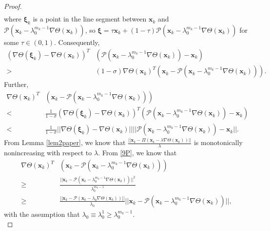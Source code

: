 \begin{proof}
\begin{align*}
	\end{align*}
	where $ \bm{\xi}_k $ is a point in the line segment between $ \textbf{x}_k $ and $ \mathcal{P}  (\textbf{x}_k - \lambda_0^{m_{k}-1} \nabla \Theta(\textbf{x}_k)) $, so $ \bm{\xi} = \tau \textbf{x}_k + (1-\tau) \mathcal{P}(\textbf{x}_k - \lambda_0^{m_{k}-1} \nabla \Theta (\textbf{x}_k))$ for some $\tau \in (0,1)  $.
	Consequently, 
	\begin{align*}
	(\nabla \Theta(\bm{\xi}_k) - \nabla \Theta(\textbf{x}_k))^T & (\mathcal{P}(\textbf{x}_k - \lambda_0^{m_{k}-1} \nabla \Theta(\textbf{x}_k))- \textbf{x}_k)\\
	> &(1 -\sigma) \nabla \Theta(\textbf{x}_k)^T ( \textbf{x}_k - \mathcal{P}(\textbf{x}_k - \lambda_0^{m_{k}-1} \nabla \Theta(\textbf{x}_k))).
	\end{align*}
	Further, 
	\begin{equation} \label{18P}
	\begin{split}
	\nabla \Theta(\textbf{x}_k)^T & ( \textbf{x}_k - \mathcal{P}(\textbf{x}_k - \lambda_0^{m_{k}-1} \nabla \Theta(\textbf{x}_k)))\\
	< &\frac{1}{1 -\sigma} (\nabla \Theta(\bm{\xi}_k) - \nabla \Theta(\textbf{x}_k))^T(\mathcal{P}(\textbf{x}_k - \lambda_0^{m_{k}-1} \nabla \Theta(\textbf{x}_k))- \textbf{x}_k)\\
	< &\frac{1}{1 -\sigma} ||\nabla \Theta(\bm{\xi}_k) - \nabla \Theta(\textbf{x}_k)|| ||\mathcal{P}(\textbf{x}_k - \lambda_0^{m_{k}-1} \nabla \Theta(\textbf{x}_k))- \textbf{x}_k||.
	\end{split}
	\end{equation}
	From Lemma \ref{lem2paper}, we know that $ \frac{|| \textbf{x}_k - \varPi(\textbf{x}_k -  \lambda \nabla \Theta (\textbf{x}_k)) ||}{\lambda} $ is monotonically nonincreasing with respect to $ \lambda $. 
	From \eqref{9P}, we know that 
	\begin{align*}
	\nabla \Theta(\textbf{x}_k)^T & ( \textbf{x}_k - \mathcal{P}(\textbf{x}_k - \lambda_0^{m_{k}-1} \nabla \Theta(\textbf{x}_k)))\\
	\geq & \frac{|| \textbf{x}_k - \mathcal{P}(\textbf{x}_k -  \lambda_0^{m_k -1} \nabla \Theta (\textbf{x}_k)) ||^2}{\lambda_0^{m_k -1}}\\
	\geq & \frac{|| \textbf{x}_k - \mathcal{P}(\textbf{x}_k -  \lambda_0 \nabla \Theta (\textbf{x}_k)) ||}{\lambda_0} || \textbf{x}_k - \mathcal{P}(\textbf{x}_k -  \lambda_0^{m_k -1} \nabla \Theta (\textbf{x}_k)) ||,
	\end{align*}
	with the assumption that $ \lambda_0 \equiv \lambda_0^1 \geq \lambda_0^{m_k-1}$. \\

\end{proof}
